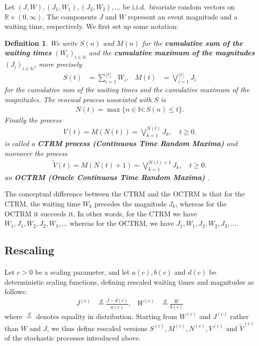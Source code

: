 \documentclass[12pt, a4paper]{article}
\newtheorem{definition}[equation]{Definition}
\newcommand{\N}{\mathbb{N}}
\newcommand{\1}{\mathbf 1}
\begin{document}
Let $(J,W),(J_1,W_1),(J_2,W_2), \ldots$ 
be i.i.d.\ bivariate random vectors on $\mathbb R \times (0, \infty)$. 
The components $J$ and $W$ represent an event magnitude and 
a waiting time, respectively. 
We first set up some notation: 


\begin{definition}
We write $S(n)$ and $M(n)$ for the \textbf{cumulative sum of the waiting times} $(W_i)_{i \in \N}$ and the \textbf{cumulative maximum of the magnitudes} $(J_i)_{i \in \N}$, more precisely 
\begin{align}
S(t) &= \sum_{i=1}^{\lfloor t \rfloor} W_i, 
&
M(t) &= \bigvee_{i=1}^{\lfloor t \rfloor} J_i
\end{align} 
for the cumulative sum of the waiting times and the cumulative maximum of the 
magnitudes. 
The renewal process associated with $S$ is 
\begin{align} \label{eq:renewal-process}
N(t) = \max\{n \in \mathbb N: S(n) \le t\}.
\end{align}
Finally the process
\begin{align}
V(t) 
= M\left( N(t) \right) 
= \bigvee_{k=1}^{N(t)} J_k, \quad t \ge 0.
\end{align}
is called a \textbf{CTRM process (Continuous Time Random Maxima)} and moreover the process
\begin{align}
\tilde V(t) 
= M\left( N(t) + 1 \right) 
= \bigvee_{k=1}^{N(t) + 1} J_k, \quad t \ge 0.
\end{align}
an \textbf{OCTRM (Oracle Continuous Time Random Maxima)}
.
\end{definition}

The conceptual difference between the CTRM and the OCTRM is that for the CTRM, 
the waiting time $W_k$ precedes the magnitude $J_k$, whereas for 
the OCTRM it succeeds it. In other words, for the CTRM we have 
$W_1, J_1, W_2, J_2, W_3, \ldots$ whereas for the
OCTRM, we have $J_1, W_1, J_2, W_2, J_3, \ldots$. 


\subsection{Rescaling}

\paragraph{}
Let $c > 0$ be a scaling parameter, and let 
$a(c), b(c)$ and $d(c)$ be deterministic scaling functions,
defining rescaled waiting times and magnitudes as follows: 
\begin{align}
J^{(c)} &\stackrel{d}{=} \frac{J - d(c)}{a(c)}, 
& 
W^{(c)} &\stackrel{d}{=} \frac{W}{b(c)}
\end{align}
where $\stackrel{d}{=}$ denotes equality in distribution. 
Starting from $W^{(c)}$ and $J^{(c)}$ rather than $W$ and $J$, we thus define rescaled 
versions $S^{(c)}, M^{(c)}, N^{(c)}, V^{(c)}$ and $\tilde V^{(c)}$ of the 
stochastic processes introduced above. 
\end{document}
